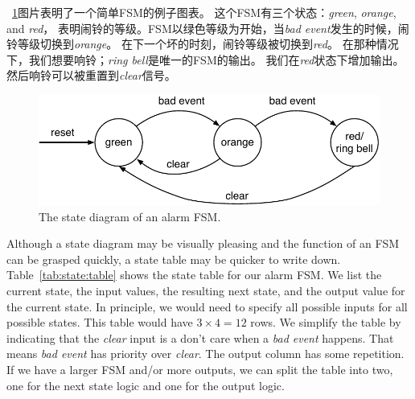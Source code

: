 \documentclass[%
    10pt,
    headinclude, footexclude,
    openright, %
    notitlepage,
    cleardoubleempty,
    headsepline,
    pointlessnumbers,
    bibtotoc, idxtotoc,
    ]{scrbook}
\newcommand{\scale}{0.7}
\begin{document}
~\ref{fig:diag-moore}图片表明了一个简单FSM的例子图表。
这个FSM有三个状态：\emph{green}, \emph{orange}, and \emph{red}，
表明闹铃的等级。FSM以绿色等级为开始，当\emph{bad event}发生的时候，闹铃等级切换到\emph{orange}。
在下一个坏的时刻，闹铃等级被切换到\emph{red}。
在那种情况下，我们想要响铃；\emph{ring bell}是唯一的FSM的输出。
我们在\emph{red}状态下增加输出。
然后响铃可以被重置到\emph{clear}信号。

\begin{figure}
  \centering
  \includegraphics[scale=\scale]{figures/state-diag-moore}
  \caption{The state diagram of an alarm FSM.}
  \label{fig:diag-moore}
\end{figure}

Although a state diagram may be visually pleasing and the function of an FSM
can be grasped quickly, a state table may be quicker to write down.
Table~\ref{tab:state:table} shows the state table for our alarm FSM.
We list the current state, the input values, the resulting next state, and
the output value for the current state. In principle, we would need to
specify all possible inputs for all possible states. This table would have
$3 \times 4 = 12$ rows. We simplify the table by indicating that the \emph{clear}
input is a don't care when a \emph{bad event} happens. That means
\emph{bad event} has priority over \emph{clear}. The output column
has some repetition. If we have a larger FSM and/or more outputs, we
can split the table into two, one for the next state logic and one for the
output logic.
\end{document}
